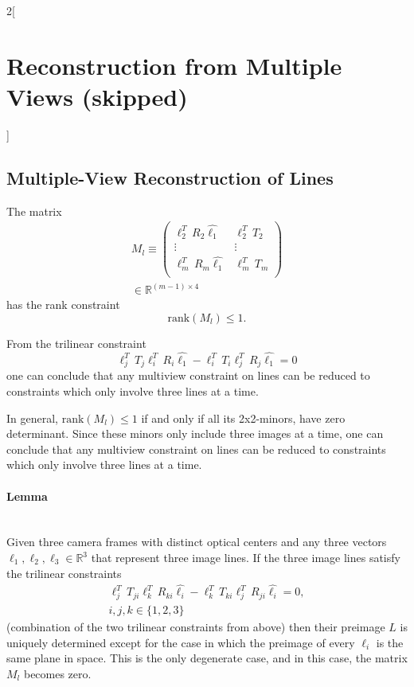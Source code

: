\documentclass[oneside,fontsize=11pt,paper=a4]{scrartcl}
\begin{document}
\begin{multicols}{2}[\section{Reconstruction from Multiple Views (skipped)}]
\subsection{Multiple-View Reconstruction of Lines}
The matrix 
\begin{equation*}
\begin{split}
    M_l \equiv \begin{pmatrix}\ell_2^T \, R_2 \hat{\ell_1} & \ell_2^T \, T_2 \\ \vdots & \vdots \\ \ell_m^T \, R_m \hat{\ell_1} & \ell_m^T \, T_m \\ \end{pmatrix} \\ \in \mathbb{R}^{(m-1) \times 4}
\end{split}
\end{equation*}
has the rank constraint
\begin{equation*}
    \text{rank}(M_l) \leq 1.
\end{equation*}

From the trilinear constraint
\begin{equation*}
    \ell_j^T \, T_j \ell_i^T \, R_i \hat{\ell_1} - \ell_i^T \, T_i \ell_j^T \, R_j \hat{\ell_1} = 0
\end{equation*}
one can conclude that any multiview constraint on lines can be reduced to constraints which only involve three lines at a time.

In general, $\text{rank}(M_l) \leq 1$ if and only if all its 2x2-minors, have zero determinant. Since these minors only include three images at a time, one can conclude that any multiview constraint on lines can be reduced to constraints which only involve three lines at a time.
\paragraph{Lemma} \mbox{}\\
Given three camera frames with distinct optical centers and any three vectors $\ell_1, \ell_2, \ell_3 \in \mathbb{R}^3$ that represent three image lines. If the three image lines satisfy the trilinear constraints
\begin{equation*}
\begin{split}
    \ell_j^T \, T_{ji} \ell_k^T \, R_{ki} \hat{\ell_i} - \ell_k^T \, T_{ki} \ell_j^T \, R_{ji} \hat{\ell_i} = 0, \\ i, j, k \in \{1, 2, 3\}
\end{split}
\end{equation*}
(combination of the two trilinear constraints from above) then their preimage $L$ is uniquely determined except for the case in which the preimage of every $\ell_i$ is the same plane in space. This is the only degenerate case, and in this case, the matrix $M_l$ becomes zero.\\


\end{multicols}
\end{document}
